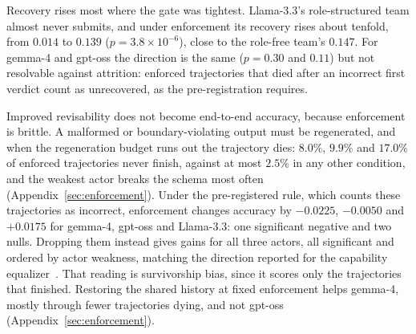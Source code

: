 Recovery rises most where the gate was tightest. Llama-3.3's
role-structured team almost never submits, and under enforcement its
recovery rises about tenfold, from $0.014$ to $0.139$
($p=3.8\times10^{-6}$), close to the role-free team's $0.147$. For gemma-4
and gpt-oss the direction is the same ($p=0.30$ and $0.11$) but not
resolvable against attrition: enforced trajectories that died after an
incorrect first verdict count as unrecovered, as the pre-registration
requires.

Improved revisability does not become end-to-end accuracy, because
enforcement is brittle. A malformed or boundary-violating output must be
regenerated, and when the regeneration budget runs out the trajectory dies:
$8.0\%$, $9.9\%$ and $17.0\%$ of enforced trajectories never finish,
against at most $2.5\%$ in any other condition, and the weakest actor
breaks the schema most often (Appendix~\ref{sec:enforcement}). Under the pre-registered rule,
which counts these trajectories as incorrect, enforcement changes accuracy
by $-0.0225$, $-0.0050$ and $+0.0175$ for gemma-4, gpt-oss and Llama-3.3:
one significant negative and two nulls. Dropping them instead gives gains
for all three actors, all significant and ordered by actor weakness,
matching the direction reported for the capability
equalizer~\cite{canedo2026architecture}. That reading is survivorship bias,
since it scores only the trajectories that finished. Restoring the shared
history at fixed enforcement helps gemma-4, mostly through fewer
trajectories dying, and not gpt-oss (Appendix~\ref{sec:enforcement}).
